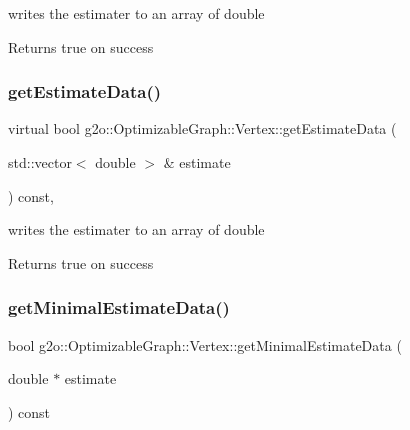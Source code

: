 writes the estimater to an array of double \begin{DoxyReturn}{Returns}
true on success 
\end{DoxyReturn}
\mbox{\label{classg2o_1_1_optimizable_graph_1_1_vertex_acc3b27eab95474c09ad52e6931f1d635}} 
\subsubsection{\texorpdfstring{get\+Estimate\+Data()}{getEstimateData()}\hspace{0.1cm}{\footnotesize\ttfamily [2/2]}}
{\footnotesize\ttfamily virtual bool g2o\+::\+Optimizable\+Graph\+::\+Vertex\+::get\+Estimate\+Data (\begin{DoxyParamCaption}\item[{std\+::vector$<$ double $>$ \&}]{estimate }\end{DoxyParamCaption}) const\hspace{0.3cm}{\ttfamily [inline]}, {\ttfamily [virtual]}}

writes the estimater to an array of double \begin{DoxyReturn}{Returns}
true on success 
\end{DoxyReturn}
\mbox{\label{classg2o_1_1_optimizable_graph_1_1_vertex_ac9cae6014e4bc7df2565638ad0699958}} 
\subsubsection{\texorpdfstring{get\+Minimal\+Estimate\+Data()}{getMinimalEstimateData()}\hspace{0.1cm}{\footnotesize\ttfamily [1/2]}}
{\footnotesize\ttfamily bool g2o\+::\+Optimizable\+Graph\+::\+Vertex\+::get\+Minimal\+Estimate\+Data (\begin{DoxyParamCaption}\item[{double $\ast$}]{estimate }\end{DoxyParamCaption}) const\hspace{0.3cm}{\ttfamily [virtual]}}

